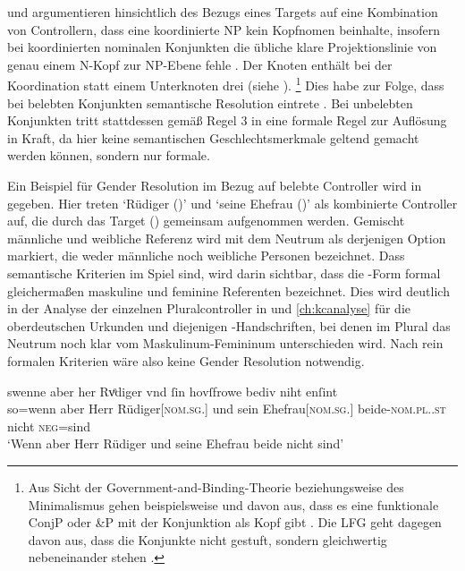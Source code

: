 \citet[182--183]{wechslerzlatic2003} und \citet[576]{wechsler2009}
argumentieren hinsichtlich des Bezugs eines Targets auf eine Kombination von
Controllern, dass eine koordinierte NP kein Kopf\-nomen beinhalte, insofern bei
koordinierten nominalen Konjunkten die übliche klare Projektionslinie von genau
einem N-Kopf zur NP-Ebene fehle \autocites[183, Fußnote
85]{wechslerzlatic2003}[585, Fußnote 7]{wechsler2009}. Der Knoten 
enthält bei der Koordination statt einem Unterknoten drei
(siehe ).%
%
	\footnote{Aus Sicht der Government-and-Binding-Theorie beziehungsweise des
	Minimalismus gehen beispielsweise
	\textcites{johannessen1998}{johannessen2005} und \citet{shen2019} davon
	aus, dass es eine funktionale ConjP oder \&P mit der Konjunktion als Kopf
	gibt \autocite[dagegen aber][]{borsley2005}. Die LFG geht dagegen davon
	aus, dass die Konjunkte nicht gestuft, sondern gleichwertig nebeneinander
	stehen \autocites[vgl.~z.\,B.][]{peterson2004}{sadlernordlinger2006}.}
%
Dies habe zur Folge, dass bei belebten Konjunkten semantische Resolution
eintrete \autocites[183]{wechslerzlatic2003}[576]{wechsler2009}. Bei unbelebten
Konjunkten tritt stattdessen gemäß Regel 3 in  eine
formale Regel zur Auflösung in Kraft, da hier keine semantischen
Geschlechtsmerkmale geltend gemacht werden können, sondern nur formale.

Ein Beispiel für Gender Resolution im Bezug auf belebte Controller wird in
 gegeben. Hier treten  `Rüdiger (\MascM)' und
 `seine Ehefrau (\FemF)' als kombinierte Controller auf, die
durch das Target  (\NeutMF) gemeinsam aufgenommen werden. Gemischt
männliche und weibliche Referenz wird mit dem Neutrum als derjenigen Option
markiert, die weder männliche noch weibliche Personen bezeichnet. Dass
semantische Kriterien im Spiel sind, wird darin sichtbar, dass die
-Form formal gleichermaßen maskuline und feminine Referenten
bezeichnet. Dies wird deutlich in der Analyse der einzelnen Pluralcontroller in
 und \ref{ch:kcanalyse} für die
oberdeutschen Urkunden und diejenigen \KC{}-Handschriften, bei
denen im Plural das Neutrum noch klar vom Maskulinum-Femininum unterschieden
wird. Nach rein formalen Kriterien wäre also keine Gender Resolution notwendig.

\begin{exe}
\ex \label{ex:gendres2}
		\gll swenne aber her Rvͦdiger vnd ſin
			hovſfrowe bediv niht enſint \\
		so=wenn aber Herr Rüdiger[\textsc{nom.sg.\MascM}] und sein
			Ehefrau[\textsc{nom.sg.\FemF}] beide-\textsc{nom.pl.\NeutMF.st}
			nicht \textsc{neg}=sind \\
		\trans `Wenn aber Herr Rüdiger und seine Ehefrau
			beide nicht  sind'
			\parencites(Nr.~3262, Regensburg, 1299)[425,13--14]{cao4}
\end{exe}

